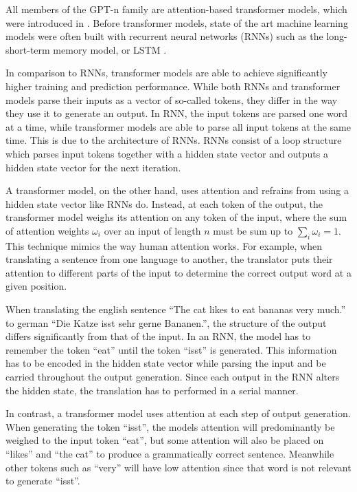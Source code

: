 All members of the GPT-n family are attention-based transformer models, which were introduced in \cite{Vaswani2017}.
Before transformer models, state of the art machine learning models were often built with recurrent neural networks (RNNs) such as the long-short-term memory model, or LSTM \cite{Hochreiter1997}.

In comparison to RNNs, transformer models are able to achieve significantly higher training and prediction performance.
While both RNNs and transformer models parse their inputs as a vector of so-called tokens, they differ in the way they use it to generate an output.
In RNN, the input tokens are parsed one word at a time, while transformer models are able to parse all input tokens at the same time.
This is due to the architecture of RNNs.
RNNs consist of a loop structure which parses input tokens together with a hidden state vector and outputs a hidden state vector for the next iteration.

A transformer model, on the other hand, uses attention and refrains from using a hidden state vector like RNNs do.
Instead, at each token of the output, the transformer model weighs its attention on any token of the input, where the sum of attention weights $\omega_i$ over an input of length $n$ must be sum up to $\sum_i \omega_i = 1$.
This technique mimics the way human attention works.
For example, when translating a sentence from one language to another, the translator puts their attention to different parts of the input to determine the correct output word at a given position.

\begin{example}
	When translating the english sentence ``The cat likes to eat bananas very much.'' to german ``Die Katze isst sehr gerne Bananen.'', the structure of the output differs significantly from that of the input.
	In an RNN, the model has to remember the token ``eat'' until the token ``isst'' is generated.
	This information has to be encoded in the hidden state vector while parsing the input and be carried throughout the output generation.
	Since each output in the RNN alters the hidden state, the translation has to performed in a serial manner.
		
	In contrast, a transformer model uses attention at each step of output generation.
	When generating the token ``isst'', the models attention will predominantly be weighed to the input token ``eat'', but some attention will also be placed on ``likes'' and ``the cat'' to produce a grammatically correct sentence.
	Meanwhile other tokens such as ``very'' will have low attention since that word is not relevant to generate ``isst''.
\end{example}



